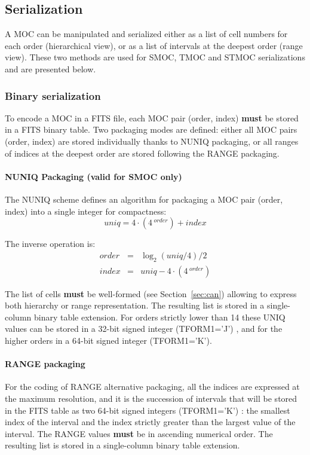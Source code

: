 \documentclass[11pt,a4paper]{ivoa}
\begin{document}
\subsection{Serialization}
A MOC can be manipulated and serialized either as a list of cell
numbers for each order (hierarchical view), or as a list of intervals
at the deepest order (range view). These two methods are used for
SMOC, TMOC and STMOC serializations and are presented below.

\subsubsection{Binary serialization}
To encode a MOC in a FITS file, each MOC pair (order, index) {\bf
  must} be stored in a FITS binary table. Two packaging modes are
defined: either all MOC pairs (order, index) are stored individually
thanks to NUNIQ packaging, or all ranges of indices at the deepest
order are stored following the RANGE packaging.

\paragraph{NUNIQ Packaging (valid for SMOC only)}
The NUNIQ scheme defines an algorithm for packaging a MOC pair (order,
index) into a single integer for compactness:
$$
    \textit{uniq} = 4 \cdot (4\,^\textit{order}) + \textit{index}
$$

\par\noindent
The inverse operation is:
\begin{eqnarray*}
    \textit{order} & = &\log_2(\textit{uniq}/4)/2\\
    \textit{index} & = &\textit{uniq} - 4 \cdot (4\,^\textit{order})
\end{eqnarray*}

\par\noindent The list of cells {\bf must} be well-formed
(see Section~\ref{sec:can}) allowing
to express both hierarchy or range representation. The resulting
list is stored in a single-column binary table extension.
For orders strictly lower than 14 these UNIQ values can be stored
in a 32-bit signed integer (TFORM1='J') , and for the higher
orders in a 64-bit signed integer (TFORM1='K').

\paragraph{RANGE packaging}
For the coding of RANGE alternative packaging, all the indices are
expressed at the maximum resolution, and it is the succession
of intervals that will be stored in the FITS table as 
two 64-bit signed integers (TFORM1='K') :
the smallest index of the interval and the index strictly greater
than the largest value of the interval. The RANGE values {\bf must}
be in ascending numerical order. The resulting list is stored in a
single-column binary table extension. 
\end{document}
